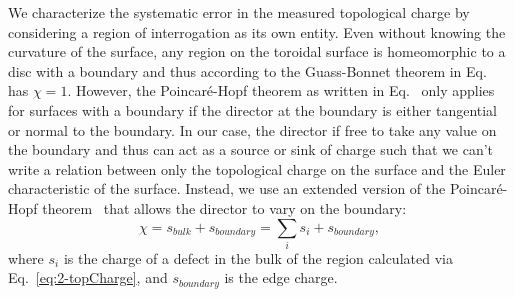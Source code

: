 We characterize the systematic error in the measured topological charge by considering a region of interrogation as its own entity.
Even without knowing the curvature of the surface, any region on the toroidal surface is homeomorphic to a disc with a boundary and thus according to the Guass-Bonnet theorem in Eq.~ has $\chi = 1$.
However, the Poincar\'e-Hopf theorem as written in Eq.~ only applies for surfaces with a boundary if the director at the boundary is either tangential or normal to the boundary.
In our case, the director if free to take any value on the boundary and thus can act as a source or sink of charge such that we can't write a relation between only the topological charge on the surface and the Euler characteristic of the surface.
Instead, we use an extended version of the Poincar\'e-Hopf theorem~ that allows the director to vary on the boundary:
\begin{equation}
  \chi = s_{bulk} + s_{boundary} = \sum\limits_i s_i + s_{boundary},\label{e:3-extendedPH}
\end{equation}
where $s_i$ is the charge of a defect in the bulk of the region calculated via Eq.~\ref{eq:2-topCharge}, and $s_{boundary}$ is the edge charge.


